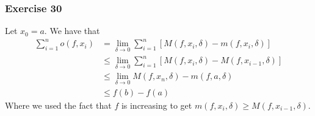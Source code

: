 \subsubsection{Exercise 30}
Let $x_0 = a$. We have that
\begin{align*}
        \sum_{i = 1}^n o(f, x_i) &= \lim_{\delta \to 0} \sum_{i = 1}^n [M(f, x_i, \delta) - m(f, x_i, \delta)] \\
                                 &\leq \lim_{\delta \to 0} \sum_{i = 1}^n [M(f, x_i, \delta) - M(f, x_{i - 1}, \delta)] \\
                                 &\leq \lim_{\delta \to 0} M(f, x_n, \delta) - m(f, a, \delta) \\
                                 &\leq f(b) - f(a)
\end{align*}
Where we used the fact that $f$ is increasing to get $m(f, x_i, \delta) \geq M(f, x_{i - 1}, \delta)$.
